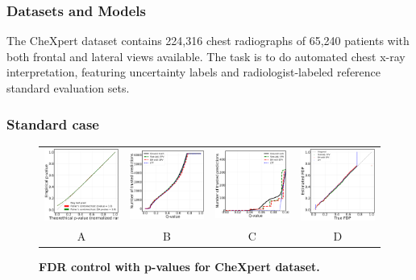 \documentclass{article}
\begin{document}
\subsubsection{Datasets and Models}

The CheXpert dataset contains 224,316 chest radiographs of 65,240 patients with both frontal and lateral views available. The task is to do automated chest x-ray interpretation, featuring uncertainty labels and radiologist-labeled reference standard evaluation sets.

\subsubsection{Standard case}

\begin{figure}
	\centering
	\begin{tabular}{cccc}
 		\includegraphics[width=1.7in]{img/cnn_QQ_chx.png} &
		\includegraphics[width=1.7in]{img/cnn_chx_fdr_control.png} & 
            \includegraphics[width=1.7in]{img/cnn_chx_fdr_control_loc.png} & 
            \includegraphics[width=1.7in]{img/cnn_FDPscat_chx.png}
		\\	
		A & B & C & D
	\end{tabular}
	\caption{\bf FDR control with p-values for CheXpert dataset.}
	\label{fig:pcam}
\end{figure}
\end{document}
